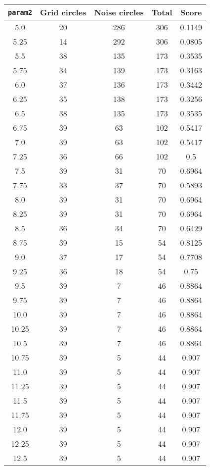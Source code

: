 \documentclass[letterpaper, 12pt]{article}
\begin{document}
\begin{longtable}{|c|c|c|c|c|}
\hline
\textbf{\texttt{param2}} & \textbf{Grid circles} & \textbf{Noise circles} & \textbf{Total} & \textbf{Score} \\
\hline
5.0 & 20 & 286 & 306 & 0.1149 \\
\hline
5.25 & 14 & 292 & 306 & 0.0805 \\
\hline
5.5 & 38 & 135 & 173 & 0.3535 \\
\hline
5.75 & 34 & 139 & 173 & 0.3163 \\
\hline
6.0 & 37 & 136 & 173 & 0.3442 \\
\hline
6.25 & 35 & 138 & 173 & 0.3256 \\
\hline
6.5 & 38 & 135 & 173 & 0.3535 \\
\hline
6.75 & 39 & 63 & 102 & 0.5417 \\
\hline
7.0 & 39 & 63 & 102 & 0.5417 \\
\hline
7.25 & 36 & 66 & 102 & 0.5 \\
\hline
7.5 & 39 & 31 & 70 & 0.6964 \\
\hline
7.75 & 33 & 37 & 70 & 0.5893 \\
\hline
8.0 & 39 & 31 & 70 & 0.6964 \\
\hline
8.25 & 39 & 31 & 70 & 0.6964 \\
\hline
8.5 & 36 & 34 & 70 & 0.6429 \\
\hline
8.75 & 39 & 15 & 54 & 0.8125 \\
\hline
9.0 & 37 & 17 & 54 & 0.7708 \\
\hline
9.25 & 36 & 18 & 54 & 0.75 \\
\hline
9.5 & 39 & 7 & 46 & 0.8864 \\
\hline
9.75 & 39 & 7 & 46 & 0.8864 \\
\hline
10.0 & 39 & 7 & 46 & 0.8864 \\
\hline
10.25 & 39 & 7 & 46 & 0.8864 \\
\hline
10.5 & 39 & 7 & 46 & 0.8864 \\
\hline
10.75 & 39 & 5 & 44 & 0.907 \\
\hline
11.0 & 39 & 5 & 44 & 0.907 \\
\hline
11.25 & 39 & 5 & 44 & 0.907 \\
\hline
11.5 & 39 & 5 & 44 & 0.907 \\
\hline
11.75 & 39 & 5 & 44 & 0.907 \\
\hline
12.0 & 39 & 5 & 44 & 0.907 \\
\hline
12.25 & 39 & 5 & 44 & 0.907 \\
\hline
12.5 & 39 & 5 & 44 & 0.907 \\

\end{longtable}
\end{document}
